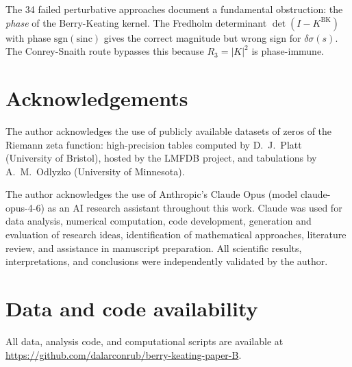 \documentclass[11pt]{article}
\begin{document}
The 34 failed perturbative approaches document a fundamental obstruction:
the \emph{phase} of the Berry-Keating kernel. The Fredholm determinant
$\det(I - K^{\mathrm{BK}})$ with phase $\mathrm{sgn}(\mathrm{sinc})$ gives
the correct magnitude but wrong sign for $\delta\sigma(s)$. The
Conrey-Snaith route bypasses this because $R_3 = |K|^2$ is phase-immune.


\section*{Acknowledgements}

The author acknowledges the use of publicly available datasets of zeros
of the Riemann zeta function: high-precision tables computed by
D.~J.~Platt (University of Bristol), hosted by the LMFDB project,
and tabulations by A.~M.~Odlyzko (University of Minnesota).

The author acknowledges the use of Anthropic's Claude Opus
(model claude-opus-4-6) as an AI research assistant throughout this work.
Claude was used for data analysis, numerical computation, code development,
generation and evaluation of research ideas, identification of mathematical
approaches, literature review, and assistance in manuscript preparation.
All scientific results, interpretations, and conclusions were independently
validated by the author.

\section*{Data and code availability}

All data, analysis code, and computational scripts are available at
\url{https://github.com/dalarconrub/berry-keating-paper-B}.




\end{document}
